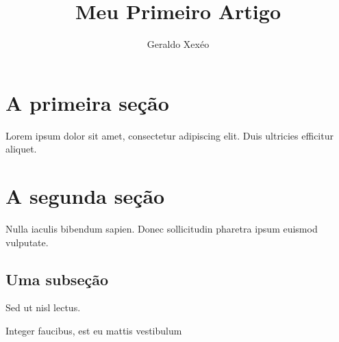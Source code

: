 \documentclass{article}
\title{Meu Primeiro Artigo}
\author{Geraldo Xexéo}
\begin{document}
  
\maketitle
    
\section{A primeira seção}
Lorem ipsum dolor sit amet, consectetur 
adipiscing elit. Duis ultricies efficitur aliquet. 
 

\section{A segunda seção}
 Nulla iaculis bibendum sapien. 
 Donec sollicitudin pharetra ipsum euismod vulputate. 

\subsection{Uma subseção}
Sed ut nisl lectus. 

Integer faucibus, est eu mattis vestibulum   
\end{document}
